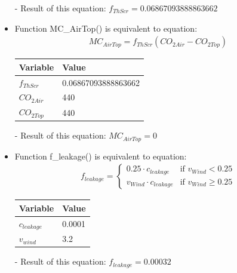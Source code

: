 \documentclass[a4paper]{article}
\begin{document}
\begin{itemize}
  \item[-] Result of this equation: \(f_{ThScr} = 0.06867093888863662\)

  \item Function MC\_AirTop() is equivalent to equation:
        \begin{align*}
          MC_{AirTop} = f_{ThScr} (CO_{2 Air} - CO_{2 Top})
        \end{align*}

        \begin{table}[H]
          \centering
          \begin{tabular}{|l|l|}
            \hline
            \textbf{Variable} & \textbf{Value}      \\ \hline
            \(f_{ThScr}\)     & 0.06867093888863662 \\ \hline
            \(CO_{2 Air}\)    & 440                 \\ \hline
            \(CO_{2 Top}\)    & 440                 \\ \hline
          \end{tabular}
        \end{table}

  \item[-] Result of this equation: \(MC_{AirTop} = 0\)

  \item Function f\_leakage() is equivalent to equation:
        \begin{align*}
          f_{leakage} = \begin{cases}
            0.25 \cdot c_{leakage}     & \text{if~} v_{Wind} < 0.25    \\
            v_{Wind} \cdot c_{leakage} & \text{if~} v_{Wind} \geq 0.25
          \end{cases}
        \end{align*}

        \begin{table}[H]
          \centering
          \begin{tabular}{|l|l|}
            \hline
            \textbf{Variable} & \textbf{Value} \\ \hline
            \(c_{leakage}\)   & 0.0001         \\ \hline
            \(v_{wind}\)      & 3.2            \\ \hline
          \end{tabular}
        \end{table}

  \item[-] Result of this equation: \(f_{leakage} = 0.00032\)


\end{itemize}
\end{document}
